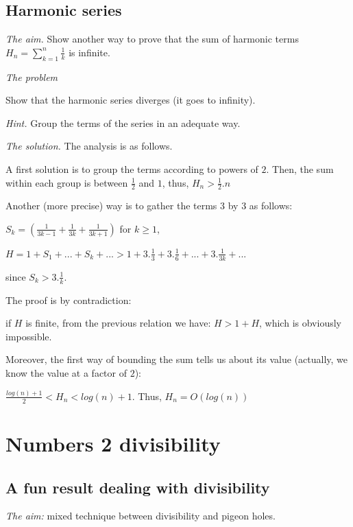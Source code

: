 \subsection{Harmonic series}

\noindent \textit{The aim.}
Show another way to prove that the sum of harmonic terms $H_{n} = \sum_{k=1}^{n} \frac{1}{k}$ is infinite.
\medskip

\noindent \textit{The problem}

Show that the harmonic series diverges (it goes to infinity).
\medskip

\noindent \textit{Hint.}
Group the terms of the series in an adequate way.
\medskip

 \noindent \textit{The solution.}
The analysis is as follows.

A first solution is to group the terms according to powers of $2$. 
Then, the sum within each group is between $\frac{1}{2}$ and $1$, thus,
$H_n > \frac{1}{2}.n$
\medskip

Another (more precise) way is to gather the terms 3 by 3 as follows:

$S_k = (\frac{1}{3k-1} + \frac{1}{3k} + \frac{1}{3k+1} )$ for $k\geq1$, 

$H = 1 + S_1 + ... + S_k + ... > 1 + 3.\frac{1}{3} + 3.\frac{1}{6} + ... + 3.\frac{1}{3k} + ... $

since $S_k > 3.\frac{1}{k} $.

The proof is by contradiction:

if $H$ is finite, from the previous relation we have: $H > 1 + H$, which is obviously impossible.
\medskip

Moreover, the first way of  bounding the sum tells us about its value (actually, we know the value at a factor of $2$):

$\frac{log(n)+1}{2} < H_n < log(n)+1$. Thus, $H_n = O(log(n))$




\section{Numbers 2 divisibility}

\subsection{A fun result dealing with divisibility}

\noindent \textit{The aim:}
mixed technique between divisibility and pigeon holes.

